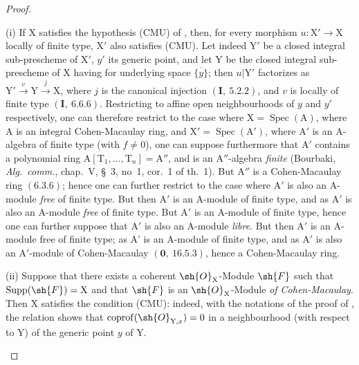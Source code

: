 \begin{proof}
\begin{remarks}[6.11.9]
\label{IV.6.11.9}
(i) If $\mathrm{X}$ satisfies the hypothesis (CMU) of , then, for every morphism $u:\mathrm{X}'\to\mathrm{X}$
locally of finite type, $\mathrm{X}'$ also satisfies (CMU). Let indeed $\mathrm{Y}'$ be a closed integral sub-prescheme of $\mathrm{X}'$, $y'$ its
generic point, and let $\mathrm{Y}$ be the closed integral sub-prescheme of $\mathrm{X}$ having for underlying space $\overline{\{y\}}$; then $u|\mathrm{Y}'$
factorizes as $\mathrm{Y}'\overset{v}{\to}\mathrm{Y}\overset{j}{\to}\mathrm{X}$, where $j$ is the canonical injection $({\mathbf{I}},~5.2.2)$, and $v$ is locally of finite type $(\mathbf{I},~6.6.6)$.
Restricting to affine open neighbourhoods of $y$ and $y'$ respectively, one can therefore restrict to the case
where $\mathrm{X}=\operatorname{Spec}(\mathrm{A})$, where $\mathrm{A}$ is an integral Cohen-Macaulay ring, and $\mathrm{X}'=\operatorname{Spec}(\mathrm{A}')$, where $\mathrm{A}'$ is an $\mathrm{A}$-algebra
of finite type (with $f\neq 0$), one can suppose furthermore that $\mathrm{A}'$ contains a polynomial ring $\mathrm{A}[\mathrm{T}_1,\ldots,\mathrm{T}_n]=\mathrm{A}''$, and is an
$\mathrm{A}''$-algebra \emph{finite} (Bourbaki, \emph{Alg.~comm.}, chap.~V, \S~3, no~1, cor.~1 of th.~1). But $\mathrm{A}''$ is a Cohen-Macaulay ring
$(6.3.6)$; hence one can further restrict to the case where $\mathrm{A}'$ is also an $\mathrm{A}$-module \emph{free} of finite type. But then $\mathrm{A}'$ is an $\mathrm{A}$-module of
finite type, and as $\mathrm{A}'$ is also an $\mathrm{A}$-module \emph{free} of finite type. But $\mathrm{A}'$ is an $\mathrm{A}$-module of finite type,
hence one can further suppose that $\mathrm{A}'$ is also an $\mathrm{A}$-module \emph{libre}. But then $\mathrm{A}'$ is an $\mathrm{A}$-module free of finite type; as $\mathrm{A}$'
is an $\mathrm{A}$-module of finite type, and as $\mathrm{A}'$ is also an $\mathrm{A}'$-module of Cohen-Macaulay
$(\mathbf{0},~16.5.3)$, hence a Cohen-Macaulay ring.

(ii) Suppose that there exists a coherent $\sh{O}_\mathrm{X}$-Module $\sh{F}$ such that $\operatorname{Supp}(\sh{F})=\mathrm{X}$ and that $\sh{F}$ is an $\sh{O}_\mathrm{X}$-Module
\emph{of Cohen-Macaulay}. Then $\mathrm{X}$ satisfies the condition (CMU): indeed, with the notations of the proof of ,
the relation  shows that $\operatorname{coprof}(\sh{O}_{\mathrm{Y},x})=0$ in a neighbourhood (with respect to $\mathrm{Y}$) of the
generic point $y$ of $\mathrm{Y}$.


\end{remarks}
\end{proof}

